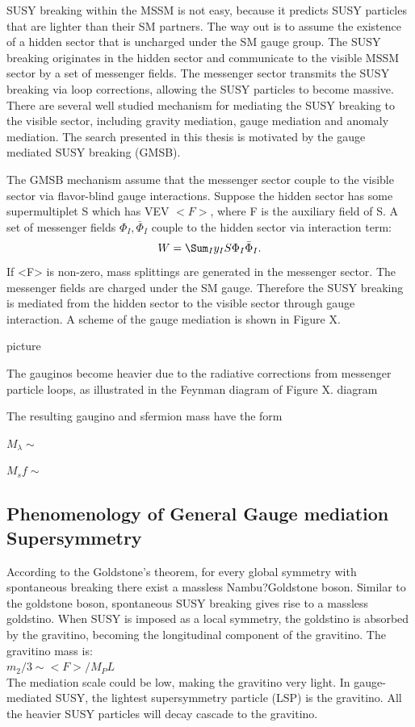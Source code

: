 \documentclass[thesis.tex]{subfiles}
\begin{document}
SUSY breaking within the MSSM is not easy, because it predicts SUSY particles that are lighter than their SM partners. 
The way out is to assume the existence of a hidden sector that is uncharged under the SM gauge group. 
The SUSY breaking originates in the hidden sector and communicate to the visible MSSM sector by a set of messenger fields. 
The messenger sector transmits the SUSY breaking via loop corrections, allowing the SUSY particles to become massive. 
There are several well studied mechanism for mediating the SUSY breaking to the visible sector, including gravity mediation, gauge mediation and anomaly mediation. 
The search presented in this thesis is motivated by the gauge mediated SUSY breaking (GMSB). 

The GMSB mechanism assume that the messenger sector couple to the visible sector via flavor-blind gauge interactions. 
Suppose the hidden sector has some supermultiplet S which has VEV $<F>$, where F is the auxiliary field of S. 
A set of messenger fields ${\Phi_I, \bar{\Phi}_I}$ couple to the hidden sector via interaction term:
	 \begin{equation}
	W = \Sum_I y_I S \Phi_I \bar{\Phi}_I.
	\end{equation}
If <F> is non-zero, mass splittings are generated in the messenger sector. 
The messenger fields are charged under the SM gauge. 
Therefore the SUSY breaking is mediated from the hidden sector to the visible sector through gauge interaction. A scheme of the gauge mediation is shown in Figure X. 

picture

The gauginos become heavier due to the radiative corrections from messenger particle loops, as illustrated in the Feynman diagram of Figure X. 
 	diagram

The resulting gaugino and sfermion mass have the form

	$M_\lambda \sim $ 
	
	$M_sf \sim$

\subsection{Phenomenology of General Gauge mediation Supersymmetry}

According to the Goldstone's theorem, for every global symmetry with spontaneous breaking there exist a massless Nambu?Goldstone boson. 
Similar to the goldstone boson, spontaneous SUSY breaking gives rise to a massless goldstino. 
When SUSY is imposed as a local symmetry, the goldstino is absorbed by the gravitino, becoming the longitudinal component of the gravitino. 
The gravitino mass is:\\
	$m_2/3 \sim <F>/M_PL$
	\\
The mediation scale could be low, making the gravitino very light. 
In gauge-mediated SUSY, the lightest supersymmetry particle (LSP) is the gravitino. 
All the heavier SUSY particles will decay cascade to the gravitino. 
\end{document}
